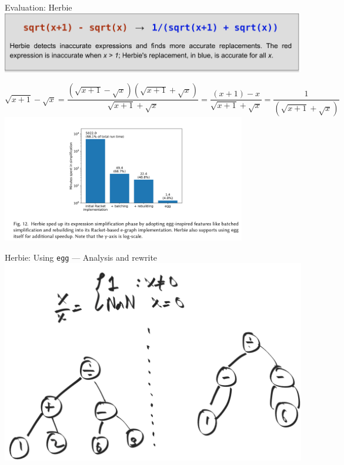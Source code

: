 \documentclass[8pt]{beamer}
\newcommand{\egg}{\texttt{egg} }
\begin{document}
\begin{frame}{Evaluation: Herbie}
\includegraphics[width=\textwidth]{./herbie-sales-pitch.png}
\pause

$$
\sqrt{x+1}-\sqrt{x} =
\frac{(\sqrt{x+1}-\sqrt{x})(\sqrt{x+1}+\sqrt{x})}{\sqrt{x+1}+\sqrt{x}}
= \frac{(x+1)-x}{\sqrt{x+1}+\sqrt{x}} = \frac{1}{(\sqrt{x+1}+\sqrt{x})}
$$
\pause
\includegraphics[width=0.8\textwidth]{./herbie-speedup.png}

\end{frame}

\begin{frame}[fragile]{Herbie: Using \egg --- Analysis and rewrite}
\includegraphics[width=\textwidth]{./rewrite-1.png}
\end{frame}
\end{document}
